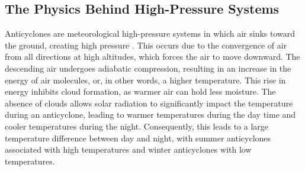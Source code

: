 \subsection{The Physics Behind High-Pressure Systems}
Anticyclones are meteorological high-pressure systems in which air sinks toward the ground, creating high pressure \cite{spiridonovCyclonesAnticyclonesSpringerLink2020}. This occurs due to the convergence of air from all directions at high altitudes, which forces the air to move downward. The descending air undergoes adiabatic compression, resulting in an increase in the energy of air molecules, or, in other words, a higher temperature. This rise in energy inhibits cloud formation, as warmer air can hold less moisture. The absence of clouds allows solar radiation to significantly impact the temperature during an anticyclone, leading to warmer temperatures during the day time and cooler temperatures during the night. Consequently, this leads to a large temperature difference between day and night, with summer anticyclones associated with high temperatures and winter anticyclones with low temperatures. 

